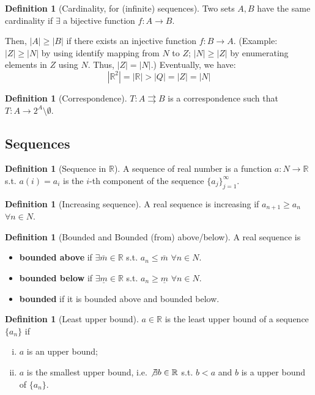 \documentclass[12pt]{article}
\newcommand{\R}{{\mathbb R}}
\theoremstyle{definition}
\newtheorem{definition}[theorem]{Definition}
\theoremstyle{plain}
\begin{document}
\begin{definition}
    [Cardinality, for (infinite) sequences]
    Two sets $A, B$ have the same cardinality if $\exists$ a bijective function 
    $f : A\to B$. 

    Then, $|A|\ge |B|$ if there exists an injective function $f: B \to A$.
    (Example: $|Z|\ge |N|$ by using identify mapping from $N$ to $Z$; $|N|\ge 
    |Z|$ by enumerating elements in $Z$ using $N$. Thus, $|Z| = |N|$.) 
    Eventually, we have: 
    \[
        |\R^2| = |\R| > |Q| = |Z| = |N|
    \]

\end{definition}

\begin{definition}
    [Correspondence]
    $T: A \rightrightarrows B$ is a correspondence such that $T: A \to 2^A
    \setminus \emptyset$.
\end{definition}

\subsection{Sequences}
\setcounter{theorem}{0}
\begin{definition}
    [Sequence in $\R$]
    A sequence of real number is a function $a : N \to \R$ s.t. $a(i) = a_i$ is 
    the $i$-th component of the sequence $\{a_j\}_{j=1}^\infty$.
\end{definition}
\begin{definition}
    [Increasing sequence]
    A real sequence is increasing if $a_{n+1} \ge a_n$ $\forall n \in N$.
\end{definition}
\begin{definition}
    [Bounded and Bounded (from) above/below]
    A real sequence is
    
    \begin{itemize}
        \item \textbf{bounded above} if $\exists \bar m \in \R$ s.t. $a_n \le 
            \bar m$ $\forall n \in N$.

        \item \textbf{bounded below} if $\exists \underline m \in \R$ s.t. $a_n 
            \ge \underline m$ $\forall n \in N$.
        \item \textbf{bounded} if it is bounded above and bounded below.
    \end{itemize}
\end{definition}

\begin{definition}
    [Least upper bound]
    $a \in \R$ is the least upper bound of a sequence $\{a_n\}$ if 
    \begin{enumerate}[(i)]
        \item $a$ is an upper bound;
        \item $a$ is the smallest upper bound, i.e. $\not \exists b \in \R$ s.t. 
            $b < a$ and $b$ is a upper bound of $\{a_n\}$.
    \end{enumerate}
\end{definition}
\end{document}
